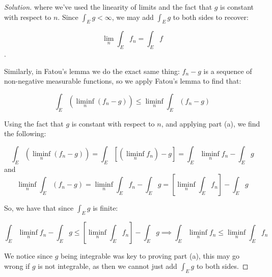 \documentclass[10pt]{article}
\begin{document}
\begin{proof}[Solution]
where we've used the linearity of limits and the fact that $g$ is constant with respect to $n$. Since $\int_E g < \infty$, we may add $\int_E g$ to both sides to recover:

$$  \lim_n \int_E f_n  =  \int_E f$$.

Similarly, in Fatou's lemma we do the exact same thing: $f_n - g$ is a sequence of non-negative measurable functions, so we apply Fatou's lemma to find that:

$$ \int_E (\liminf_n  (f_n - g)) \leq \liminf_n \int_E (f_n - g)$$

Using the fact that $g$ is constant with respect to $n$, and applying part (a), we find the following:

$$  \int_E (\liminf_n  (f_n - g)) = \int_E [(\liminf_n f_n) - g] = \int_E \liminf_n f_n - \int_E g$$
and
$$ \liminf_n \int_E (f_n - g) = \liminf_n \int_E f_n - \int_E g = [\liminf_n \int_E f_n ] - \int_E g$$

So, we have that since $\int_E g$ is finite:

$$  \int_E \liminf_n f_n - \int_E g \leq  [\liminf_n \int_E f_n ] - \int_E g \implies \int_E \liminf_n f_n  \leq  \liminf_n \int_E f_n $$

We notice since $g$ being integrable was key to proving part (a), this may go wrong if $g$ is not integrable, as then we cannot just add $\int_E g$ to both sides.

 
\end{proof}
\end{document}
